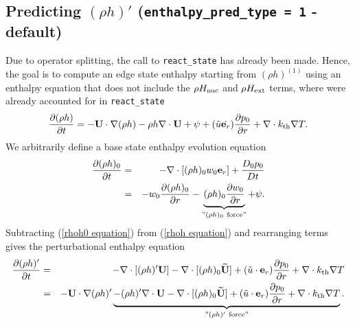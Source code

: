 \subsection{Predicting $(\rho h)'$ ({\tt enthalpy\_pred\_type = 1} - default)}
Due to operator splitting, the call to {\tt react\_state} has already been made.  Hence, the goal 
is to compute an edge state enthalpy starting from $(\rho h)^{(1)}$ using an enthalpy
equation that does not include the $\rho H_{\rm nuc}$ and $\rho H_{\rm ext}$ terms, where were 
already accounted for in {\tt react\_state}
\begin{equation}
\frac{\partial(\rho h)}{\partial t} = -{\bf U}\cdot\nabla(\rho h) - \rho h\nabla\cdot{\bf U} 
+ \psi + (\tilde{u} \dot {\mathbf{e}_r}) \frac{\partial p_0}{\partial r} + \nabla\cdot k_{\rm th}\nabla T. \label{rhoh equation}
\end{equation}
We arbitrarily define a base state enthalpy evolution equation
\begin{eqnarray}
\frac{\partial(\rho h)_0}{\partial t} &=& -\nabla\cdot[(\rho h)_0 w_0{\bf e}_r] 
+ \frac{D_0p_0}{Dt} \nonumber \\
&=& -w_0\frac{\partial(\rho h)_0}{\partial r} 
- \underbrace{(\rho h)_0\frac{\partial w_0}{\partial r}}_{"(\rho h)_0 ~ \text{force}"}
+ \psi.\label{rhoh0 equation}
\end{eqnarray}
Subtracting (\ref{rhoh0 equation}) from (\ref{rhoh equation}) and rearranging terms gives 
the perturbational enthalpy equation
\begin{eqnarray}
\frac{\partial(\rho h)'}{\partial t} &=& -\nabla\cdot[(\rho h)'{\bf U}] 
- \nabla\cdot[(\rho h)_0\widetilde{{\bf U}}] + (\tilde{u} \cdot \mathbf{e}_r)\frac{\partial p_0}{\partial r} 
+ \nabla\cdot k_{\rm th}\nabla T\nonumber \\
&=& -{\bf U}\cdot\nabla(\rho h)' \underbrace{- (\rho h)'\nabla\cdot{\bf U} 
- \nabla\cdot[(\rho h)_0\widetilde{{\bf U}}] + (\tilde{u} \cdot \mathbf{e}_r)\frac{\partial p_0}{\partial r}
+ \nabla\cdot k_{\rm th}\nabla T}_{"(\rho h)' ~ \text{force}"}. \label{rhohprime equation}
\end{eqnarray}

